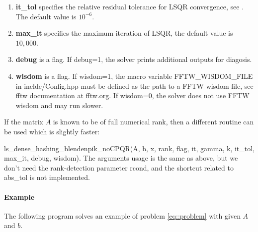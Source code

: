 \documentclass[english,11pt]{article}
\begin{document}
\begin{itemize}
\begin{enumerate}
			\item {\bf it_tol} specifies the relative residual tolerance for LSQR convergence, see \cite{Paige:1982aa}. The default value is $10^{-6}$.

			 \item {\bf max_it} specifies the maximum iteration of LSQR, the default value is $10,000$. 


			 \item {\bf debug} is a flag. If debug=1, the solver prints additional outputs for diagosis. 

			 \item {\bf wisdom} is a flag. If wisdom=1, the macro variable FFTW_WISDOM_FILE in inclde/Config.hpp must be defined as the path to a FFTW wisdom file, see fftw documentation at fftw.org. If wisdom=0, the solver does not use FFTW wisdom and may run slower. 
		\end{enumerate}
		

	\end{itemize}


If the matrix $A$ is known to be of full numerical rank, then a different routine can be used which is slightly faster:

ls_dense_hashing_blendenpik_noCPQR(A, b, x, rank, flag, it, gamma, k, it_tol, max_it, debug, wisdom). The arguments usage is the same as above, but we don't need the rank-detection parameter rcond, and the shortcut related to abs_tol is not implemented.

\paragraph{Example}

The following program solves an example of problem \eqref{eq::problem} with given $A$ and $b$. 
\end{document}
